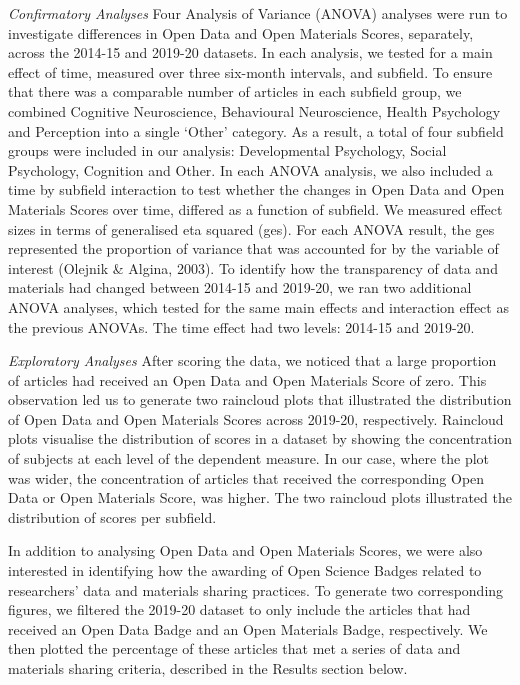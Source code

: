 \documentclass[
  english,
  man,floatsintext]{apa6}
\begin{document}
\emph{Confirmatory Analyses} Four Analysis of Variance (ANOVA) analyses were run to investigate differences in Open Data and Open Materials Scores, separately, across the 2014-15 and 2019-20 datasets. In each analysis, we tested for a main effect of time, measured over three six-month intervals, and subfield. To ensure that there was a comparable number of articles in each subfield group, we combined Cognitive Neuroscience, Behavioural Neuroscience, Health Psychology and Perception into a single `Other' category. As a result, a total of four subfield groups were included in our analysis: Developmental Psychology, Social Psychology, Cognition and Other. In each ANOVA analysis, we also included a time by subfield interaction to test whether the changes in Open Data and Open Materials Scores over time, differed as a function of subfield. We measured effect sizes in terms of generalised eta squared (ges). For each ANOVA result, the ges represented the proportion of variance that was accounted for by the variable of interest (Olejnik \& Algina, 2003).
To identify how the transparency of data and materials had changed between 2014-15 and 2019-20, we ran two additional ANOVA analyses, which tested for the same main effects and interaction effect as the previous ANOVAs. The time effect had two levels: 2014-15 and 2019-20.

\emph{Exploratory Analyses} After scoring the data, we noticed that a large proportion of articles had received an Open Data and Open Materials Score of zero. This observation led us to generate two raincloud plots that illustrated the distribution of Open Data and Open Materials Scores across 2019-20, respectively. Raincloud plots visualise the distribution of scores in a dataset by showing the concentration of subjects at each level of the dependent measure. In our case, where the plot was wider, the concentration of articles that received the corresponding Open Data or Open Materials Score, was higher. The two raincloud plots illustrated the distribution of scores per subfield.

In addition to analysing Open Data and Open Materials Scores, we were also interested in identifying how the awarding of Open Science Badges related to researchers' data and materials sharing practices. To generate two corresponding figures, we filtered the 2019-20 dataset to only include the articles that had received an Open Data Badge and an Open Materials Badge, respectively. We then plotted the percentage of these articles that met a series of data and materials sharing criteria, described in the Results section below.
\end{document}
